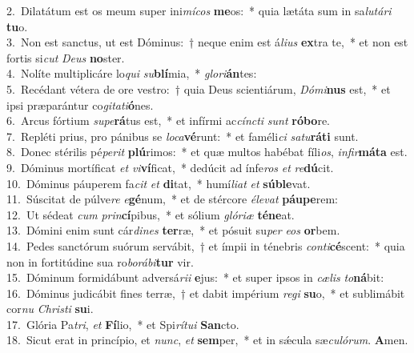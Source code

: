 {2.~}Dilatátum est os meum super ini\textit{mí}\textit{cos} \textbf{me}os:~* quia lætáta sum in sa\textit{lu}\textit{tá}\textit{ri} \textbf{tu}o.\\
{3.~}Non est sanctus, ut est Dóminus:~† neque enim est á\textit{li}\textit{us} \textbf{ex}tra te,~* et non est fortis si\textit{cut} \textit{De}\textit{us} \textbf{no}ster.\\
{4.~}Nolíte multiplicáre lo\textit{qui} \textit{su}\textbf{blí}mia,~* \textit{glo}\textit{ri}\textbf{án}tes:\\
{5.~}Recédant vétera de ore vestro:~† quia Deus scientiárum, \textit{Dó}\textit{mi}\textbf{nus} est,~* et ipsi præparántur co\textit{gi}\textit{ta}\textit{ti}\textbf{ó}nes.\\
{6.~}Arcus fórtium \textit{su}\textit{pe}\textbf{rá}tus est,~* et infírmi ac\textit{cín}\textit{cti} \textit{sunt} \textbf{ró}\textbf{bo}re.\\
{7.~}Repléti prius, pro pánibus se \textit{lo}\textit{ca}\textbf{vé}runt:~* et faméli\textit{ci} \textit{sa}\textit{tu}\textbf{rá}\textbf{ti} sunt.\\
{8.~}Donec stérilis pé\textit{pe}\textit{rit} \textbf{plú}rimos:~* et quæ multos habébat fíli\textit{os}, \textit{in}\textit{fir}\textbf{má}\textbf{ta} est.\\
{9.~}Dóminus mortíficat \textit{et} \textit{vi}\textbf{ví}ficat,~* dedúcit ad ínfe\textit{ros} \textit{et} \textit{re}\textbf{dú}cit.\\
{10.~}Dóminus páuperem fa\textit{cit} \textit{et} \textbf{di}tat,~* humí\textit{li}\textit{at} \textit{et} \textbf{sú}\textbf{ble}vat.\\
{11.~}Súscitat de púlve\textit{re} \textit{e}\textbf{gé}num,~* et de stércore \textit{é}\textit{le}\textit{vat} \textbf{páu}\textbf{pe}rem:\\
{12.~}Ut sédeat \textit{cum} \textit{prin}\textbf{cí}pibus,~* et sólium \textit{gló}\textit{ri}\textit{æ} \textbf{té}\textbf{ne}at.\\
{13.~}Dómini enim sunt cár\textit{di}\textit{nes} \textbf{ter}ræ,~* et pósuit su\textit{per} \textit{e}\textit{os} \textbf{or}bem.\\
{14.~}Pedes sanctórum suórum servábit,~† et ímpii in ténebris \textit{con}\textit{ti}\textbf{cé}scent:~* quia non in fortitúdine sua ro\textit{bo}\textit{rá}\textit{bi}\textbf{tur} vir.\\
{15.~}Dóminum formidábunt adversá\textit{ri}\textit{i} \textbf{e}jus:~* et super ipsos in \textit{cæ}\textit{lis} \textit{to}\textbf{ná}bit:\\
{16.~}Dóminus judicábit fines terræ,~† et dabit impérium \textit{re}\textit{gi} \textbf{su}o,~* et sublimábit cor\textit{nu} \textit{Chri}\textit{sti} \textbf{su}i.\\
{17.~}Glória Pa\textit{tri}, \textit{et} \textbf{Fí}lio,~* et Spi\textit{rí}\textit{tu}\textit{i} \textbf{San}cto.\\
{18.~}Sicut erat in princípio, et \textit{nunc}, \textit{et} \textbf{sem}per,~* et in sǽcula sæ\textit{cu}\textit{ló}\textit{rum}. \textbf{A}men.\\
